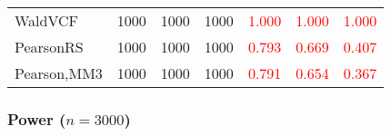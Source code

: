 \documentclass[
]{article}
\begin{document}
\begin{table}[H]
{\begin{tabular}[t]{lrrrrrr}
\hspace{1em}WaldVCF & 1000 & 1000 & 1000 & \textcolor{red}{1.000} & \textcolor{red}{1.000} & \textcolor{red}{1.000}\\
\hspace{1em}PearsonRS & 1000 & 1000 & 1000 & \textcolor{red}{0.793} & \textcolor{red}{0.669} & \textcolor{red}{0.407}\\
\hspace{1em}Pearson,MM3 & 1000 & 1000 & 1000 & \textcolor{red}{0.791} & \textcolor{red}{0.654} & \textcolor{red}{0.367}\\
\bottomrule
\end{tabular}}
\endgroup{}
\end{table}

\hypertarget{power-n3000-2}{%
\subsubsection{\texorpdfstring{Power
(\(n=3000\))}{Power (n=3000)}}\label{power-n3000-2}}
\end{document}
